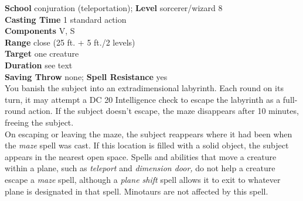 \textbf{School} conjuration (teleportation); \textbf{Level} sorcerer/wizard 8\\
\textbf{Casting Time} 1 standard action\\
\textbf{Components} V, S\\
\textbf{Range} close (25 ft. + 5 ft./2 levels)\\
\textbf{Target} one creature\\
\textbf{Duration} see text\\
\textbf{Saving Throw} none; \textbf{Spell Resistance} yes\\
You banish the subject into an extradimensional labyrinth. Each round on its turn, it may attempt a DC 20 Intelligence check to escape the labyrinth as a full-round action. If the subject doesn't escape, the maze disappears after 10 minutes, freeing the subject.\\
On escaping or leaving the maze, the subject reappears where it had been when the \textit{maze }spell was cast. If this location is filled with a solid object, the subject appears in the nearest open space. Spells and abilities that move a creature within a plane, such as \textit{teleport }and \textit{dimension door, }do not help a creature escape a \textit{maze }spell, although a \textit{plane shift }spell allows it to exit to whatever plane is designated in that spell. Minotaurs are not affected by this spell.\\
